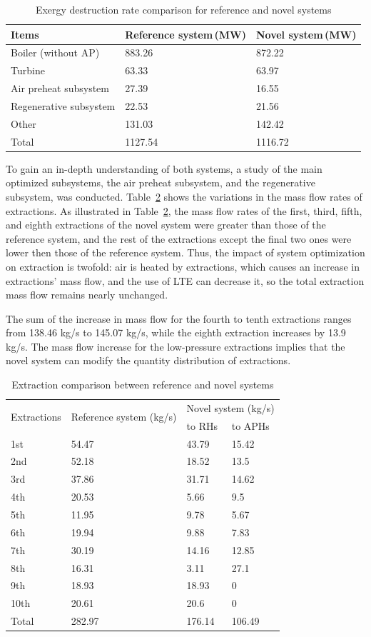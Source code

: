 \documentclass[preprint,12pt]{elsarticle}
\begin{document}
\begin{table}
\caption{Exergy destruction rate comparison for reference and novel systems }
\label{table:system exergy campare}
\centering
\begin{tabular}{lll}
\toprule 
Items & Reference system\,(MW) & Novel system\,(MW)\tabularnewline
\midrule 
Boiler (without AP) & 883.26 & 872.22\tabularnewline
Turbine & 63.33 & 63.97\tabularnewline
Air preheat subsystem  & 27.39 & 16.55\tabularnewline
Regenerative subsystem & 22.53 & 21.56\tabularnewline
Other & 131.03 & 142.42 \tabularnewline
Total & 1127.54 & 1116.72\tabularnewline
\bottomrule
\end{tabular}
\end{table}


To gain an in-depth understanding of both systems, a study of the main optimized subsystems, the air preheat subsystem, and the regenerative subsystem, was conducted.
Table~\ref{table:extraction_compare} shows the variations in the mass flow rates of extractions.
As illustrated in Table~\ref{table:extraction_compare}, the mass flow rates of the first, third, fifth, and eighth extractions of the novel system were greater than those of the reference system, and the rest of the extractions except the final two ones were lower then those of the reference system.
Thus, the impact of system optimization on extraction is twofold: air is heated by extractions, which causes an increase in extractions' mass flow, and the use of LTE can decrease it, so the total extraction mass flow remains nearly unchanged. 

The sum of the increase in mass flow for the fourth to tenth extractions ranges from 138.46 kg/s to 145.07 kg/s, while the eighth extraction increases by 13.9 kg/s.
The mass flow increase for the low-pressure extractions implies that the novel system can modify the quantity distribution of extractions.


\begin{table}
\caption{Extraction comparison between reference and novel systems}
\label{table:extraction_compare}
\begin{centering}
\begin{tabular}{llll}
\toprule 
\multirow{2}{*}{Extractions} & \multirow{2}{2.5cm}{Reference system (kg/s)} & \multicolumn{2}{c}{Novel system (kg/s)}\tabularnewline
\cmidrule{3-4} 
 &  & to RHs & to APHs\tabularnewline
\midrule
1st & 54.47 & 43.79 & 15.42\tabularnewline
2nd & 52.18 & 18.52 & 13.5\tabularnewline
3rd & 37.86 & 31.71 & 14.62\tabularnewline
4th & 20.53 & 5.66 & 9.5\tabularnewline
5th & 11.95 & 9.78 & 5.67\tabularnewline
6th & 19.94 & 9.88 & 7.83\tabularnewline
7th & 30.19 & 14.16 & 12.85\tabularnewline
8th & 16.31 & 3.11 & 27.1\tabularnewline
9th & 18.93 & 18.93 & 0\tabularnewline
10th & 20.61 & 20.6 & 0\tabularnewline
Total & 282.97 & 176.14 & 106.49\tabularnewline
\bottomrule
\end{tabular}
\par\end{centering}
\end{table}
\end{document}
